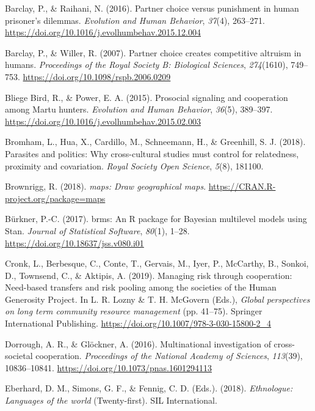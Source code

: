 \documentclass[english,man,floatsintext]{apa6}
\begin{document}
\leavevmode\hypertarget{ref-Barclay2016a}{}%
Barclay, P., \& Raihani, N. (2016). Partner choice versus punishment in human prisoner's dilemmas. \emph{Evolution and Human Behavior}, \emph{37}(4), 263--271. \url{https://doi.org/10.1016/j.evolhumbehav.2015.12.004}

\leavevmode\hypertarget{ref-Barclay2007}{}%
Barclay, P., \& Willer, R. (2007). Partner choice creates competitive altruism in humans. \emph{Proceedings of the Royal Society B: Biological Sciences}, \emph{274}(1610), 749--753. \url{https://doi.org/10.1098/rspb.2006.0209}

\leavevmode\hypertarget{ref-BliegeBird2015}{}%
Bliege Bird, R., \& Power, E. A. (2015). Prosocial signaling and cooperation among Martu hunters. \emph{Evolution and Human Behavior}, \emph{36}(5), 389--397. \url{https://doi.org/10.1016/j.evolhumbehav.2015.02.003}

\leavevmode\hypertarget{ref-Bromham2018}{}%
Bromham, L., Hua, X., Cardillo, M., Schneemann, H., \& Greenhill, S. J. (2018). Parasites and politics: Why cross-cultural studies must control for relatedness, proximity and covariation. \emph{Royal Society Open Science}, \emph{5}(8), 181100.

\leavevmode\hypertarget{ref-Brownrigg2018}{}%
Brownrigg, R. (2018). \emph{maps: Draw geographical maps}. \url{https://CRAN.R-project.org/package=maps}

\leavevmode\hypertarget{ref-Burkner2017}{}%
Bürkner, P.-C. (2017). brms: An R package for Bayesian multilevel models using Stan. \emph{Journal of Statistical Software}, \emph{80}(1), 1--28. \url{https://doi.org/10.18637/jss.v080.i01}

\leavevmode\hypertarget{ref-Cronk2019}{}%
Cronk, L., Berbesque, C., Conte, T., Gervais, M., Iyer, P., McCarthy, B., Sonkoi, D., Townsend, C., \& Aktipis, A. (2019). Managing risk through cooperation: Need-based transfers and risk pooling among the societies of the Human Generosity Project. In L. R. Lozny \& T. H. McGovern (Eds.), \emph{Global perspectives on long term community resource management} (pp. 41--75). Springer International Publishing. \url{https://doi.org/10.1007/978-3-030-15800-2_4}

\leavevmode\hypertarget{ref-Dorrough2016}{}%
Dorrough, A. R., \& Glöckner, A. (2016). Multinational investigation of cross-societal cooperation. \emph{Proceedings of the National Academy of Sciences}, \emph{113}(39), 10836--10841. \url{https://doi.org/10.1073/pnas.1601294113}

\leavevmode\hypertarget{ref-Ethnologue}{}%
Eberhard, D. M., Simons, G. F., \& Fennig, C. D. (Eds.). (2018). \emph{Ethnologue: Languages of the world} (Twenty-first). SIL International.
\end{document}
